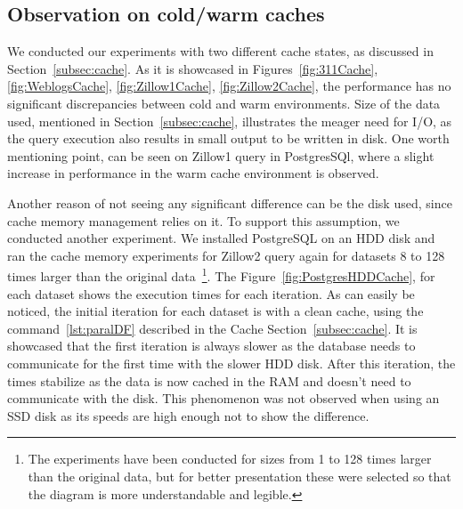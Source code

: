 
\subsection{Observation on cold/warm caches}
We conducted our experiments with two different cache states, as discussed in 
Section~\ref{subsec:cache}. As it is showcased in Figures~\ref{fig:311Cache}, \ref{fig:WeblogsCache},
\ref{fig:Zillow1Cache}, \ref{fig:Zillow2Cache}, the performance has no significant 
discrepancies between cold and warm environments. 
Size of the data used, mentioned in Section~\ref{subsec:cache}, illustrates the meager
need for I/O, as the query execution also results in small output to be written in disk.
One worth mentioning point, can be seen on Zillow1 query in PostgresSQl, where a slight increase 
in performance in the warm cache environment is observed. 

Another reason of not seeing any significant difference can be the disk used, since 
cache memory management relies on it. To support this assumption, we conducted another experiment.
We installed PostgreSQL on an HDD disk and ran the cache memory experiments for Zillow2 query again for datasets 8 to 128 times larger than the original data~\footnote{The experiments have been conducted for sizes from 1 
to 128 times larger than the original data, but for better presentation these were selected so 
that the diagram is more understandable and legible.}. The Figure~\ref{fig:PostgresHDDCache}, for 
each dataset shows the execution times for each iteration. As can easily be noticed, the 
initial iteration for each dataset is with a clean cache, using the command~\ref{lst:paralDF} 
described in the Cache Section~\ref{subsec:cache}. 
It is showcased that the first iteration is always slower as the database needs to 
communicate for the first time with the slower HDD disk. After this iteration, the times 
stabilize as the data is now cached in the RAM and doesn't need to communicate with the disk. 
This phenomenon was not observed when using an SSD disk as its speeds are high enough not to 
show the difference.

